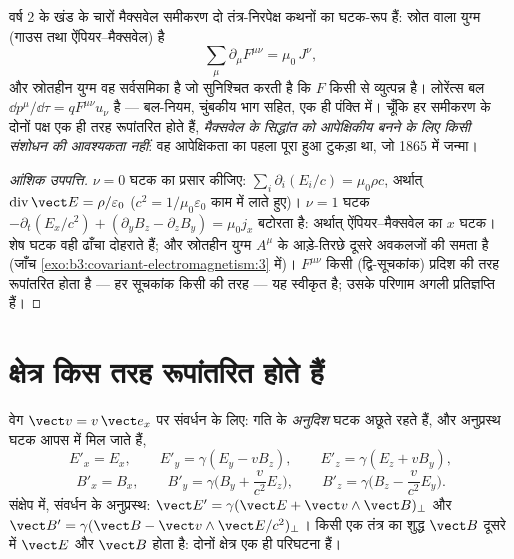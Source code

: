 \begin{theorem}[मैक्सवेल, सहचर रूप में]\label{thm:b3:covariant-electromagnetism:maxwell}
वर्ष 2 के खंड के चारों मैक्सवेल समीकरण दो तंत्र-निरपेक्ष कथनों का
घटक-रूप हैं: स्रोत वाला युग्म
(गाउस तथा ऐंपियर--मैक्सवेल) है
\[
\sum_\mu \partial_\mu F^{\mu\nu} = \mu_0\,J^\nu ,
\]
और स्रोतहीन युग्म वह सर्वसमिका है जो सुनिश्चित करती है कि
$F$ किसी  से व्युत्पन्न है। लोरेंत्स
बल $\dd p^\mu/\dd\tau = qF^{\mu\nu}u_\nu$ है --- बल-नियम,
चुंबकीय भाग सहित, एक ही पंक्ति में। चूँकि हर समीकरण के दोनों पक्ष
एक ही तरह रूपांतरित होते हैं, \emph{मैक्सवेल के सिद्धांत को आपेक्षिकीय
बनने के लिए किसी संशोधन की आवश्यकता नहीं}: वह आपेक्षिकता का पहला पूरा
हुआ टुकड़ा था, जो 1865 में जन्मा।
\end{theorem}

\begin{proof}[आंशिक उपपत्ति]
$\nu = 0$ घटक का प्रसार कीजिए: $\sum_i\partial_i(E_i/c) =
\mu_0\rho c$, अर्थात् $\operatorname{div}\vect E = \rho/\varepsilon_0$
($c^2 = 1/\mu_0\varepsilon_0$ काम में लाते हुए)। $\nu = 1$ घटक
$-\partial_t(E_x/c^2) + (\partial_yB_z - \partial_zB_y)
= \mu_0 j_x$ बटोरता है: अर्थात् ऐंपियर--मैक्सवेल का $x$ घटक। शेष
घटक वही ढाँचा दोहराते हैं; और स्रोतहीन युग्म $A^\mu$ के आड़े-तिरछे
दूसरे अवकलजों की समता है (जाँच
\cref{exo:b3:covariant-electromagnetism:3} में)। $F^{\mu\nu}$
किसी (द्वि-सूचकांक) प्रदिश की तरह रूपांतरित होता है --- हर सूचकांक किसी
 की तरह --- यह स्वीकृत है; उसके परिणाम अगली प्रतिज्ञप्ति हैं।
\end{proof}

\section{क्षेत्र किस तरह रूपांतरित होते हैं}

\begin{proposition}[क्षेत्र रूपांतरण]\label{prop:b3:covariant-electromagnetism:transform}
वेग $\vect v = v\,\vect e_x$ पर संवर्धन के लिए: गति के \emph{अनुदिश}
घटक अछूते रहते हैं, और अनुप्रस्थ घटक आपस में मिल जाते हैं,
\[
E'_x = E_x , \qquad
E'_y = \gamma(E_y - vB_z) , \qquad
E'_z = \gamma(E_z + vB_y) ,
\]
\[
B'_x = B_x , \qquad
B'_y = \gamma\Big(B_y + \frac{v}{c^2}E_z\Big) , \qquad
B'_z = \gamma\Big(B_z - \frac{v}{c^2}E_y\Big) .
\]
संक्षेप में, संवर्धन के अनुप्रस्थ: $\vect E' = \gamma(\vect E +
\vect v\wedge\vect B)_\perp$ और $\vect B' = \gamma(\vect B - \vect
v\wedge\vect E/c^2)_\perp$। किसी एक तंत्र का शुद्ध $\vect B$ दूसरे में $\vect
E$ और $\vect B$ होता है: दोनों क्षेत्र एक ही परिघटना हैं।
\end{proposition}
\admitted

